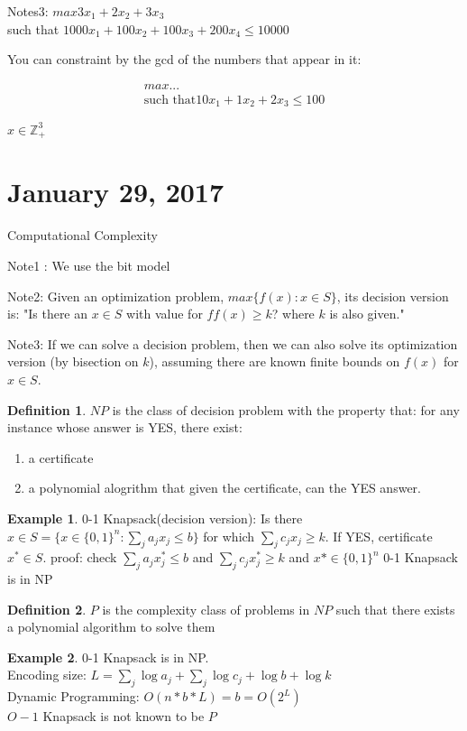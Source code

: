 \documentclass{article}
\theoremstyle{plain}
\theoremstyle{definition}
\newtheorem{eg}{Example}
\newtheorem{defn}{Definition}
\begin{document}
Notes3:
$max 3x_1 + 2x_2 + 3x_3$\\
such that $1000x_1 + 100x_2 + 100x_3 + 200x_4 \leq 10 000$

You can constraint by the gcd of the numbers that appear in it:

\begin{align*}
    max ...\\
    \text{such that} 10x_1 + 1x_2 + 2x_3 \leq 100
\end{align*}

$x\in\mathbb{Z}^3_+$

\section{January 29, 2017}
Computational Complexity

Note1 : We use the bit model

Note2: Given an optimization problem, $max\{f(x): x\in S\}$,
its decision version is:
"Is there an $x\in S$ with value for $ff(x) \geq k$? where
$k$ is also given."

Note3: If we can solve a decision problem, then we can also
solve its optimization version (by bisection on $k$), assuming
there are known finite bounds on $f(x)$ for $x\in S$.

\begin{defn}
    $NP$ is the class of decision problem with the property that:
    for any instance whose answer is YES, there exist:
    \begin{enumerate}
        \item a certificate
        \item a polynomial alogrithm that given the certificate, can
            the YES answer.
    \end{enumerate}
\end{defn}

\begin{eg}
    0-1 Knapsack(decision version): Is there
    $x\in S = \{x\in\{0,1\}^n: \sum_j a_jx_j\leq b\}$
    for which $\sum_j c_jx_j\geq k$. If YES,
    certificate $x^*\in S$. proof:
    check $\sum_j a_jx^*_j\leq b$ and
    $\sum_jc_jx^*_j \geq k$ and $x*\in \{0,1\}^n$
    0-1 Knapsack is in NP
\end{eg}

\begin{defn}
    $P$ is the complexity class of problems in $NP$ such that
    there exists a polynomial algorithm to solve them
\end{defn}
\begin{eg}
    0-1 Knapsack is in NP.\\
    Encoding size: $L = \sum_j\log a_j + \sum_j\log c_j + \log b + \log k$\\
    Dynamic Programming: $O(n*b*L) = b = O(2^L)$\\
    $O-1$ Knapsack is not known to be $P$
\end{eg}
\end{document}
